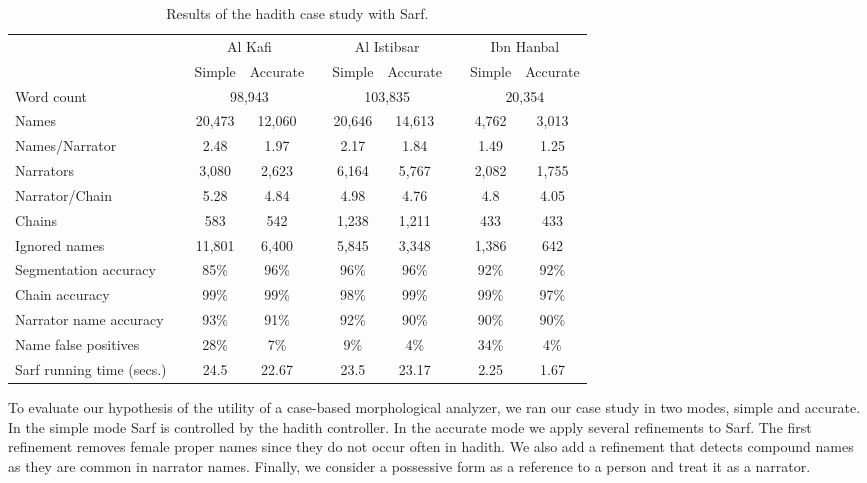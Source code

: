 \documentclass[11pt,letterpaper]{article}
\begin{document}
\begin{table*}[bt]
\centering
\caption{Results of the hadith case study with Sarf.}
\begin{tabular}{lp{.2cm}ccp{.2cm}ccp{.2cm}cc} %
 & & \multicolumn{2}{c}{Al Kafi} & & \multicolumn{2}{c}{Al Istibsar} & &\multicolumn{2}{c}{Ibn Hanbal} \\ 
 & & Simple & Accurate & & Simple & Accurate & & Simple  & Accurate \\ \hline \hline
Word count & &\multicolumn{2}{c}{98,943} & & \multicolumn{2}{c}{103,835} & & \multicolumn{2}{c}{20,354} \\ 
 Names      & & 20,473 & 12,060  & &20,646 &  14,613& & 4,762 & 3,013\\
Names/Narrator& &2.48 & 1.97 & & 2.17 &  1.84& & 1.49 & 1.25 \\
Narrators & &3,080 & 2,623 & & 6,164 &  5,767& & 2,082 & 1,755 \\ 
Narrator/Chain & & 5.28 & 4.84 & & 4.98&  4.76 & & 4.8 &4.05 \\
Chains & & 583 & 542 &  & 1,238& 1,211& & 433 & 433 \\ 
Ignored names & & 11,801 & 6,400 &  & 5,845 & 3,348 & & 1,386 & 642 \\ \hline \hline
Segmentation accuracy & & 85\% & 96\%& & 96\%& 96\%& & 92\%& 92\%\\ 
Chain accuracy & & 99\% & 99\%&  & 98\%& 99\%& & 99\% & 97\% \\ 
Narrator name accuracy & & 93\% & 91\%& &  92\%& 90\% & & 90\% & 90\% \\ \hline
Name false positives & & 28\% & 7\%&  & 9\%& 4\% & & 34\% & 4\% \\ \hline
Sarf running time (secs.)& & 24.5 & 22.67 & & 23.5 & 23.17 & & 2.25 & 1.67\\ \hline
\end{tabular}
\normalsize
\label{t:hadithresallresults}
\end{table*}

To evaluate our hypothesis of the utility of a case-based morphological analyzer,
we ran our case study in two modes, simple and accurate.
In the simple mode Sarf is controlled by the hadith controller.
In the accurate mode we apply several refinements to Sarf.
The first refinement removes female proper names since they do not occur often in
hadith.
We also add a refinement that detects compound names as they are common in narrator
names.
Finally, we consider a possessive form as a reference to a person and treat
it as a narrator.
\end{document}
